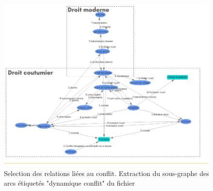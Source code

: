 \begin{figure}
  \begin{center}
    \includegraphics[width=0.99\textwidth]{img/zoneDroitConflits.png}
  \end{center}
  \caption{Selection des relations liées au conflit. Extraction du sous-graphe des arcs étiquetés "dynamique conflit" du fichier}
  \label{fig:conflict}
\end{figure}

